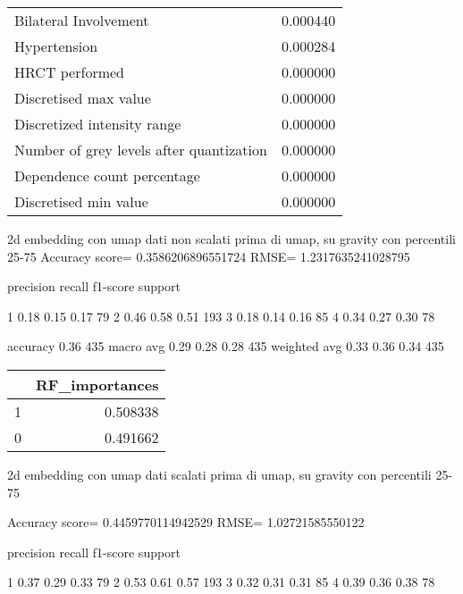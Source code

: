 \begin{tabular}{lr}
Bilateral Involvement                              &        0.000440 \\
Hypertension                                       &        0.000284 \\
HRCT performed                                     &        0.000000 \\
Discretised max value                              &        0.000000 \\
Discretized intensity range                        &        0.000000 \\
Number of grey levels after quantization           &        0.000000 \\
Dependence count percentage                        &        0.000000 \\
Discretised min value                              &        0.000000 \\
\bottomrule
\end{tabular}



2d embedding con umap dati non scalati prima di umap, su gravity con percentili 25-75
Accuracy score= 0.3586206896551724
RMSE= 1.2317635241028795

              precision    recall  f1-score   support

           1       0.18      0.15      0.17        79
           2       0.46      0.58      0.51       193
           3       0.18      0.14      0.16        85
           4       0.34      0.27      0.30        78

    accuracy                           0.36       435
   macro avg       0.29      0.28      0.28       435
weighted avg       0.33      0.36      0.34       435

\begin{tabular}{lr}
\toprule
{} &  RF\_importances \\
\midrule
1 &        0.508338 \\
0 &        0.491662 \\
\bottomrule
\end{tabular}

2d embedding con umap dati scalati prima di umap, su gravity con percentili 25-75

Accuracy score= 0.4459770114942529
RMSE= 1.02721585550122

              precision    recall  f1-score   support

           1       0.37      0.29      0.33        79
           2       0.53      0.61      0.57       193
           3       0.32      0.31      0.31        85
           4       0.39      0.36      0.38        78

